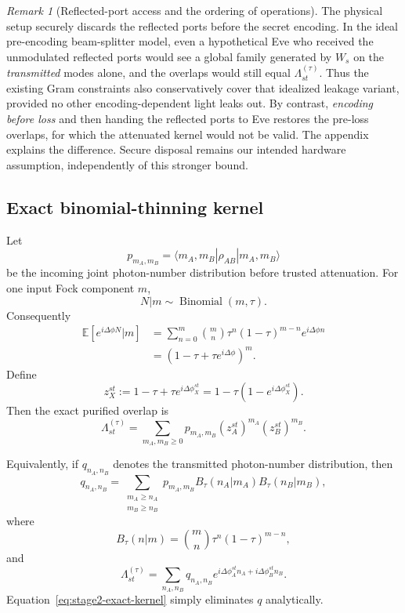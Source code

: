 \documentclass[11pt]{article}
\theoremstyle{remark}
\newtheorem{remark}{Remark}
\begin{document}
\begin{remark}[Reflected-port access and the ordering of operations]
The physical setup securely discards the reflected ports before the secret
encoding.  In the ideal pre-encoding beam-splitter model, even a hypothetical
Eve who received the unmodulated reflected ports would see a global family
generated by \(W_s\) on the \emph{transmitted} modes alone, and the
overlaps would still equal \(\Lambda^{(\tau)}_{st}\).  Thus the existing Gram
constraints also conservatively cover that idealized leakage variant,
provided no other encoding-dependent light leaks out.  By contrast,
\emph{encoding before loss} and then handing the reflected ports to Eve
restores the pre-loss overlaps, for which the attenuated kernel would not
be valid.  The appendix explains the difference.  Secure disposal remains
our intended hardware assumption, independently of this stronger bound.
\end{remark}

\subsection{Exact binomial-thinning kernel}

Let
\[
    p_{m_A,m_B}
    =
    \langle m_A,m_B|\rho_{AB}|m_A,m_B\rangle
\]
be the incoming joint photon-number distribution before trusted attenuation.
For one input Fock component \(m\),
\[
    N|m\sim\operatorname{Binomial}(m,\tau).
\]
Consequently
\begin{align}
    \mathbb E[e^{i\Delta\phi N}|m]
    &=
    \sum_{n=0}^{m}
      \binom mn
      \tau^n(1-\tau)^{m-n}
      e^{i\Delta\phi n}
    \nonumber\\
    &=
    \left(
      1-\tau+\tau e^{i\Delta\phi}
    \right)^m.
    \label{eq:stage2-binomial-kernel}
\end{align}
Define
\[
    z_X^{st}
    :=
    1-\tau+\tau e^{i\Delta\phi_X^{st}}
    =
    1-\tau(1-e^{i\Delta\phi_X^{st}}).
\]
Then the exact purified overlap is
\begin{equation}
    \boxed{
    \Lambda^{(\tau)}_{st}
    =
    \sum_{m_A,m_B\ge0}
      p_{m_A,m_B}
      (z_A^{st})^{m_A}
      (z_B^{st})^{m_B}.
    }
    \label{eq:stage2-exact-kernel}
\end{equation}

Equivalently, if \(q_{n_A,n_B}\) denotes the transmitted photon-number
distribution, then
\begin{equation}
    q_{n_A,n_B}
    =
    \sum_{\substack{m_A\ge n_A\\m_B\ge n_B}}
      p_{m_A,m_B}
      B_\tau(n_A|m_A)
      B_\tau(n_B|m_B),
    \label{eq:stage2-thinning-map}
\end{equation}
where
\[
    B_\tau(n|m)
    =
    \binom mn\tau^n(1-\tau)^{m-n},
\]
and
\[
    \Lambda^{(\tau)}_{st}
    =
    \sum_{n_A,n_B}
      q_{n_A,n_B}
      e^{i\Delta\phi_A^{st}n_A+i\Delta\phi_B^{st}n_B}.
\]
Equation~\eqref{eq:stage2-exact-kernel} simply eliminates \(q\) analytically.
\end{document}

